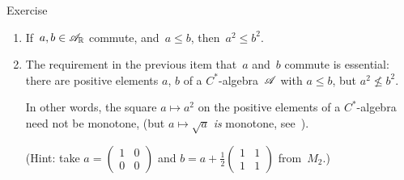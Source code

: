 \documentclass[a]{subfiles}
\begin{document}
\begin{parsec}
\begin{point}[sqrt]{Exercise}
\begin{enumerate}
\item
If~$a,b\in\mathscr{A}_{\mathbb{R}}$ commute, and~$a\leq b$, then~$a^2\leq b^2$.

\item
The requirement in the previous item  that~$a$ and~$b$ commute is essential:
there are positive elements $a$, $b$ of a $C^*$-algebra~$\mathscr{A}$
with $a\leq b$, but $a^2 \nleq b^2$.

In other words, the square $a\mapsto a^2$
on the positive elements of a $C^*$-algebra
need not be monotone,
(but $a\mapsto \sqrt{a}$ \emph{is} monotone, see~).

(Hint: take $a=(\begin{smallmatrix}1&0\\0&0\end{smallmatrix})$
and $b=a+\frac{1}{2}(\begin{smallmatrix}1&1\\1&1\end{smallmatrix})$
from~$M_2$.)
\end{enumerate}
\end{point}
\end{parsec}
\end{document}
